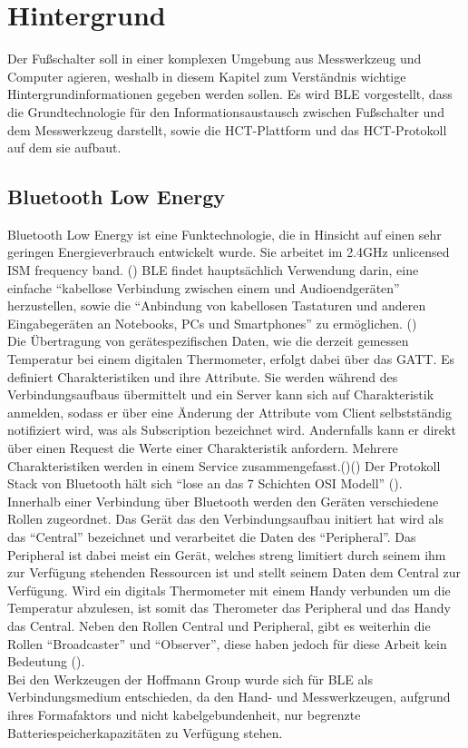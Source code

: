 \section{Hintergrund}
\label{Hintergrund}
Der Fußschalter soll in einer komplexen Umgebung aus Messwerkzeug und Computer agieren, weshalb in diesem Kapitel zum Verständnis wichtige Hintergrundinformationen gegeben werden sollen. Es wird \ac{BLE} vorgestellt, dass die Grundtechnologie für den Informationsaustausch zwischen Fußschalter und dem Messwerkzeug darstellt, sowie die \ac{HCT}-Plattform und das \ac{HCT}-Protokoll auf dem sie aufbaut.

\subsection{Bluetooth Low Energy}
Bluetooth Low Energy ist eine Funktechnologie, die in Hinsicht auf einen sehr geringen Energieverbrauch entwickelt wurde. Sie arbeitet im 2.4GHz unlicensed ISM frequency band. (\cite[]{Bluetooth_Wireless_Technology}) \ac{BLE} findet hauptsächlich Verwendung darin, eine einfache ``kabellose Verbindung zwischen einem und Audioendgeräten'' herzustellen, sowie die ``Anbindung von kabellosen Tastaturen und anderen Eingabegeräten an Notebooks, PCs und Smartphones'' zu ermöglichen. (\cite[S. 339]{Grundkurs_mobile_Kommunikation})\\
Die Übertragung von gerätespezifischen Daten, wie die derzeit gemessen Temperatur bei einem digitalen Thermometer, erfolgt dabei über das \ac{GATT}. Es definiert Charakteristiken und ihre Attribute. Sie werden während des Verbindungsaufbaus übermittelt und ein Server kann sich auf Charakteristik anmelden, sodass er über eine Änderung der Attribute vom Client selbstständig notifiziert wird, was als Subscription bezeichnet wird. Andernfalls kann er direkt über einen Request die Werte einer Charakteristik anfordern. Mehrere Charakteristiken werden in einem Service zusammengefasst.(\cite[S. 1459]{Bluetooth_Core_Specification})(\cite[]{Overview_and_Evaluation_of_BLE}) Der Protokoll Stack von Bluetooth hält sich ``lose an das 7 Schichten OSI Modell'' (\cite[S. 347]{Grundkurs_mobile_Kommunikation}).\\
Innerhalb einer Verbindung über Bluetooth werden den Geräten verschiedene Rollen zugeordnet. Das Gerät das den Verbindungsaufbau initiert hat wird als das ``Central'' bezeichnet und verarbeitet die Daten des ``Peripheral''. Das Peripheral ist dabei meist ein Gerät, welches streng limitiert durch seinem ihm zur Verfügung stehenden Ressourcen ist und stellt seinem Daten dem Central zur Verfügung. Wird ein digitals Thermometer mit einem Handy verbunden um die Temperatur abzulesen, ist somit das Therometer das Peripheral und das Handy das Central. Neben den Rollen Central und Peripheral, gibt es weiterhin die Rollen ``Broadcaster'' und ``Observer'', diese haben jedoch für diese Arbeit kein Bedeutung (\cite[S. 1246]{Bluetooth_Core_Specification}).\\
Bei den Werkzeugen der Hoffmann Group wurde sich für \ac{BLE} als Verbindungsmedium entschieden, da den Hand- und Messwerkzeugen, aufgrund ihres Formafaktors und nicht kabelgebundenheit, nur begrenzte Batteriespeicherkapazitäten zu Verfügung stehen.


